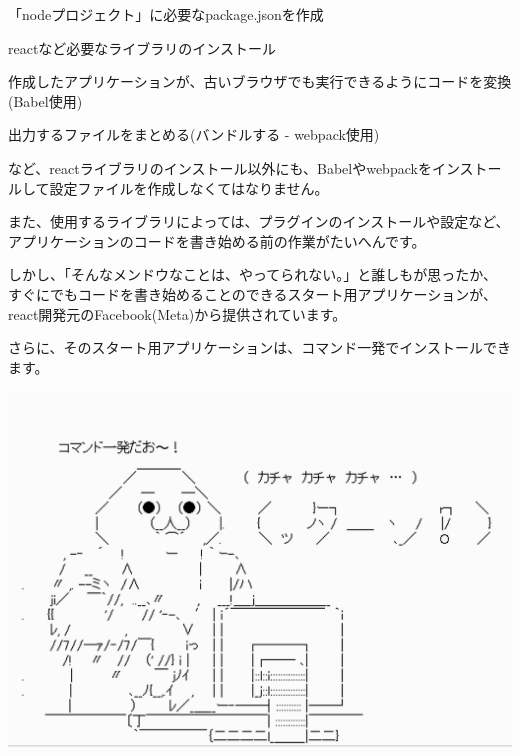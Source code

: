 \begin{starteritemize}
\item 「nodeプロジェクト」に必要なpackage.jsonを作成
\item reactなど必要なライブラリのインストール
\item 作成したアプリケーションが、古いブラウザでも実行できるようにコードを変換(Babel使用)
\item 出力するファイルをまとめる(バンドルする {-} webpack使用)
\end{starteritemize}

など、reactライブラリのインストール以外にも、Babelやwebpackをインストールして設定ファイルを作成しなくてはなりません。

\vspace*{\baselineskip}

また、使用するライブラリによっては、プラグインのインストールや設定など、アプリケーションのコードを書き始める前の作業がたいへんです。

\vspace*{\baselineskip}

しかし、「そんなメンドウなことは、やってられない。」と誰しもが思ったか、
すぐにでもコードを書き始めることのできるスタート用アプリケーションが、react開発元のFacebook(Meta)から提供されています。

\vspace*{\baselineskip}

さらに、そのスタート用アプリケーションは、コマンド一発でインストールできます。

\begin{reviewimage}[H]%
\includegraphics[width=0.7\maxwidth]{./images/02-create-react-app/oneCommand.png}%
\label{image:02-create-react-app:oneCommand}
\end{reviewimage}

